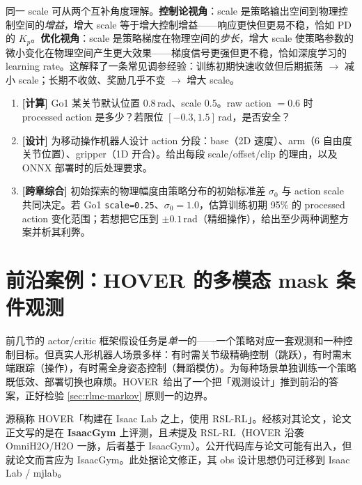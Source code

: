 \begin{insight}\label{ins:rlmc-scale-dual}
同一 scale 可从两个互补角度理解。\textbf{控制论视角}：scale 是策略输出空间到物理控制空间的\emph{增益}，增大 scale 等于增大控制增益——响应更快但更易不稳，恰如 PD 的 $K_p$。\textbf{优化视角}：scale 是策略梯度在物理空间的\emph{步长}，增大 scale 使策略参数的微小变化在物理空间产生更大效果——梯度信号更强但更不稳，恰如深度学习的 learning rate。这解释了一条常见调参经验：训练初期快速收敛但后期振荡 $\to$ 减小 scale；长期不收敛、奖励几乎不变 $\to$ 增大 scale。
\end{insight}

\begin{practice}[练习·动作空间]
\begin{enumerate}
  \item \textbf{[计算]} Go1 某关节默认位置 $0.8\,$rad、scale $0.5$。raw action $=0.6$ 时 processed action 是多少？若限位 $[-0.3,1.5]\,$rad，是否安全？
  \item \textbf{[设计]} 为移动操作机器人设计 action 分段：base（2D 速度）、arm（6 自由度关节位置）、gripper（1D 开合）。给出每段 scale/offset/clip 的理由，以及 ONNX 部署时的后处理要求。
  \item \textbf{[跨章综合]} 初始探索的物理幅度由策略分布的初始标准差 $\sigma_0$ 与 action scale 共同决定。若 Go1 \verb|scale=0.25|、$\sigma_0=1.0$，估算训练初期 95\% 的 processed action 变化范围；若想把它压到 $\pm0.1\,$rad（精细操作），给出至少两种调整方案并析其利弊。
\end{enumerate}
\end{practice}

\section{前沿案例：HOVER 的多模态 mask 条件观测}
\label{sec:rlmc-hover}

前几节的 actor/critic 框架假设任务是\emph{单一}的——一个策略对应一套观测和一种控制目标。但真实人形机器人场景多样：有时需关节级精确控制（跳跃），有时需末端跟踪（操作），有时需全身姿态控制（舞蹈模仿）。为每种场景单独训练一个策略既低效、部署切换也麻烦。HOVER\,\cite{he2025hover} 给出了一个把「观测设计」推到前沿的答案，正好检验 \cref{sec:rlmc-markov} 原则一的边界。

\begin{note}
源稿称 HOVER「构建在 Isaac Lab 之上，使用 RSL-RL」。经核对其论文\,\cite{he2025hover}，论文正文写的是在 \textbf{IsaacGym} 上评测，且\emph{未}提及 RSL-RL（HOVER 沿袭 OmniH2O/H2O 一脉，后者基于 IsaacGym）。公开代码库与论文可能有出入，但就论文而言应为 IsaacGym。此处据论文修正，其 obs 设计思想仍可迁移到 Isaac Lab / mjlab。
\end{note}

